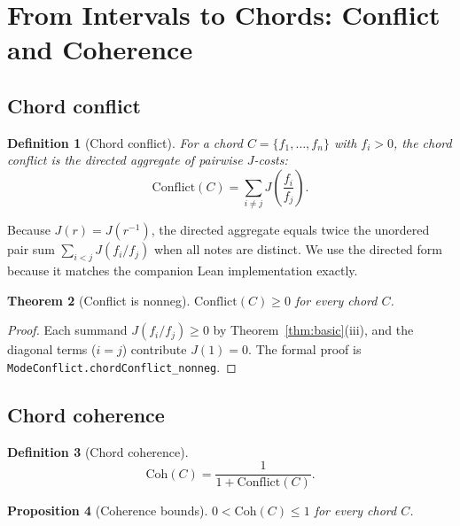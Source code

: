 \documentclass[11pt,a4paper]{article}
\newtheorem{theorem}{Theorem}
\newtheorem{proposition}[theorem]{Proposition}
\newtheorem{definition}[theorem]{Definition}
\begin{document}
\section{From Intervals to Chords: Conflict and Coherence}
\label{sec:conflict}

\subsection{Chord conflict}

\begin{definition}[Chord conflict]
\label{def:conflict}
For a chord $C=\{f_1,\ldots,f_n\}$ with $f_i>0$, the
\emph{chord conflict} is the directed aggregate of pairwise $J$-costs:
\begin{equation}
  \label{eq:conflict}
  \mathrm{Conflict}(C) = \sum_{i\neq j} J\!\left(\frac{f_i}{f_j}\right).
\end{equation}
\end{definition}

\noindent Because $J(r)=J(r^{-1})$, the directed aggregate equals
twice the unordered pair sum $\sum_{i<j}J(f_i/f_j)$ when all notes
are distinct.  We use the directed form because it matches the
companion Lean implementation exactly.

\begin{theorem}[Conflict is nonneg]
\label{thm:conflict-nonneg}
$\mathrm{Conflict}(C)\geq 0$ for every chord $C$.
\end{theorem}

\begin{proof}
Each summand $J(f_i/f_j)\geq 0$ by Theorem~\ref{thm:basic}(iii),
and the diagonal terms ($i=j$) contribute $J(1)=0$.  The formal proof
is \texttt{ModeConflict.chordConflict\_nonneg}.
\end{proof}

\subsection{Chord coherence}

\begin{definition}[Chord coherence]
\label{def:coherence}
\begin{equation}
  \label{eq:coherence}
  \mathrm{Coh}(C) = \frac{1}{1+\mathrm{Conflict}(C)}.
\end{equation}
\end{definition}

\begin{proposition}[Coherence bounds]
\label{prop:coh-bounds}
$0<\mathrm{Coh}(C)\leq 1$ for every chord $C$.
\end{proposition}
\end{document}
